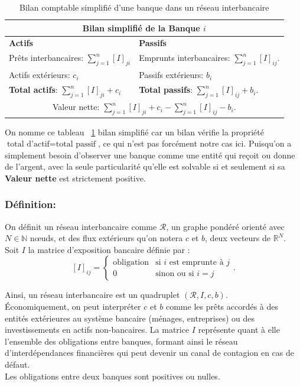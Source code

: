 \begin{table}[htbp]
    \centering
    \caption{Bilan comptable simplifié d'une banque dans un réseau interbancaire}
    \label{tab:bilan-banque}
    \begin{tabular}{ |p{2cm}|p{2cm}|  }
        \hline
        \multicolumn{2}{|c|}{Bilan simplifié de la Banque $i$} \\
        \hline
        \textbf{Actifs} & \textbf{Passifs} \\
        \hline
        Prêts interbancaires: $\sum_{j=1}^{n} [I]_{ji}$ & Emprunts interbancaires: $\sum_{j=1}^{n} [I]_{ij}.$ \\
        Actifs extérieurs: $c_i$ & Passifs extérieurs: $b_i$ \\
        \hline
        \textbf{Total actifs}: $\sum_{j=1}^{n} [I]_{ji} + c_i$ & \textbf{Total passifs}: $\sum_{j=1}^{n} [I]_{ij} + b_i.$ \\
        \hline
        \multicolumn{2}{|c|}{Valeur nette: $\sum_{j=1}^{n} [I]_{ji} + c_i - \sum_{j=1}^{n} [I]_{ij} - b_i.$} \\
        \hline
    \end{tabular}
\end{table}

On nomme ce tableau ~\ref{tab:bilan-banque} bilan simplifié car un bilan vérifie la propriété $\text{total d'actif} = \text{total passif}$, ce qui n'est pas forcément notre cas ici.
Puisqu'on a simplement besoin d'observer une banque comme une entité qui reçoit ou donne de l'argent, avec la seule
particularité qu'elle est solvable si et seulement si sa \textbf{Valeur nette} est strictement positive.

\subsubsection*{Définition:}
On définit un réseau interbancaire comme $\mathcal{R}$, un graphe pondéré orienté avec
$N \in \mathbb{N}$ nœuds, et des flux extérieurs qu'on notera $c$ et $b$, deux vecteurs de $\mathbb{R}^N$.
\\
Soit $I$ la matrice d'exposition bancaire définie par :
$$[I]_{ij} = \begin{cases}
                 \text{obligation} & \text{si $i$ est emprunte à $j$} \\
                 0 & \text{sinon ou si $i = j$}
\end{cases}.$$

Ainsi, un réseau interbancaire est un quadruplet $(\mathcal{R}, I, c, b)$.
\\
Économiquement, on peut interpréter $c$ et $b$ comme les prêts accordés à des entités extérieures au système bancaire (ménages, entreprises) ou des investissements en actifs non-bancaires.
La matrice $I$ représente quant à elle l'ensemble des obligations entre banques, formant ainsi le réseau d'interdépendances financières qui peut devenir un canal de contagion en cas de défaut.
\\
Les obligations entre deux banques sont positives ou nulles.

